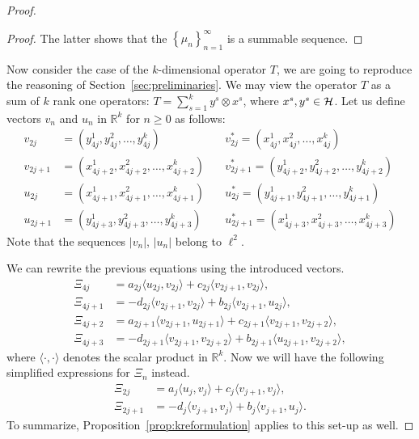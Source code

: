 \begin{proof}
\begin{proof}
        The latter shows that the $\left\{\mu_n\right\}_{n=1}^\infty$ is a summable sequence.
      \end{proof}
      Now consider the case of the $k$-dimensional operator $T$, we are going to reproduce the reasoning of Section~\ref{sec:preliminaries}.
      We may view the operator $T$ as a sum of $k$ rank one operators: $T = \sum_{s=1}^k y^s \otimes x^s$, where $x^s, y^s \in \cal{H}$.
      Let us define vectors $v_n$ and $u_n$ in $\mathbb{R}^k$ for $n \geq 0 $ as follows:
      \begin{align*}
        v_{2j} &= (y^1_{4j}, y^2_{4j}, \dots ,y^k_{4j}) \quad
        &v^*_{2j} = (x^1_{4j}, x^2_{4j}, \dots ,x^k_{4j}) \\
        v_{2j+1} &= (x^1_{4j+2}, x^2_{4j+2}, \dots ,x^k_{4j+2}) \quad
        &v^*_{2j+1} = (y^1_{4j+2}, y^2_{4j+2}, \dots ,y^k_{4j+2}) \\
        u_{2j} &= (x^1_{4j+1}, x^2_{4j+1}, \dots ,x^k_{4j+1}) \quad
        &u^*_{2j} = (y^1_{4j+1}, y^2_{4j+1}, \dots ,y^k_{4j+1}) \\
        u_{2j+1} &= (y^1_{4j+3}, y^2_{4j+3}, \dots ,y^k_{4j+3}) \quad
        &u^*_{2j+1} = (x^1_{4j+3}, x^2_{4j+3}, \dots ,x^k_{4j+3})
      \end{align*}
      Note that the sequences $\lvert v_n \rvert$, $\lvert u_n \rvert$ belong to $\ell^2$.

      We can rewrite the previous equations using the introduced vectors.
      \begin{align*}
        \Xi_{4j} &= a_{2j} \langle u_{2j}, v_{2j}\rangle + c_{2j} \langle v_{2j+1}, v_{2j}\rangle,\\
        \Xi_{4j + 1} &= -d_{2j} \langle v_{2j+1}, v_{2j}\rangle + b_{2j} \langle v_{2j+1}, u_{2j}\rangle,\\
        \Xi_{4j + 2} &= a_{2j+1} \langle v_{2j+1}, u_{2j+1} \rangle + c_{2j+1} \langle v_{2j+1}, v_{2j+2} \rangle,\\
        \Xi_{4j + 3} &= -d_{2j+1} \langle v_{2j+1}, v_{2j+2}\rangle + b_{2j+1} \langle u_{2j+1}, v_{2j+2} \rangle,
      \end{align*}
        where $\langle\cdot, \cdot\rangle$ denotes the scalar product in $\mathbb{R}^k$.
      Now we will have the following simplified expressions for $\Xi_n$ instead.
      \begin{align*}
        \Xi_{2j} &= a_{j} \langle u_{j}, v_{j} \rangle  + c_{j} \langle v_{j+1}, v_{j} \rangle,\\
        \Xi_{2j + 1} &= -d_{j} \langle v_{j+1}, v_{j} \rangle + b_{j} \langle v_{j+1}, u_{j}\rangle.
      \end{align*}
      To summarize, Proposition~\ref{prop:kreformulation} applies to this set-up as well.


\end{proof}
